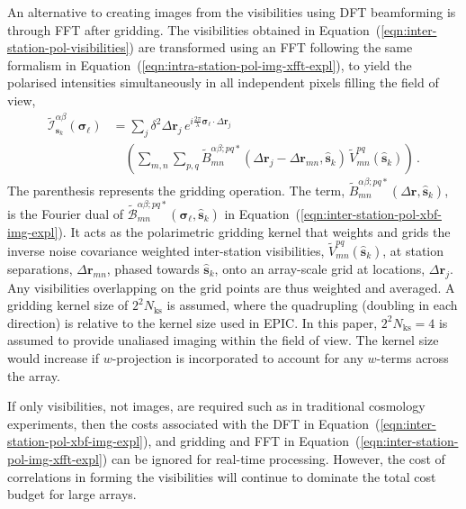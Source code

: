 \documentclass[
  journal=pasa,
  manuscript=article-type,
  year=2020,
  volume=37,
]{cup-journal}
\begin{document}
An alternative to creating images from the visibilities using DFT beamforming is through FFT after gridding. The visibilities obtained in Equation~(\ref{eqn:inter-station-pol-visibilities}) are transformed using an FFT following the same formalism in Equation~(\ref{eqn:intra-station-pol-img-xfft-expl}), to yield the polarised intensities simultaneously in all independent pixels filling the field of view,
\begin{align}
  \widetilde{\mathcal{I}}_{\hat{\boldsymbol{s}}_k}^{\alpha\beta}(\boldsymbol{\sigma}_\ell) &= \sum_j \delta^2 \Delta\boldsymbol{r}_j \, e^{i\frac{2\pi}{\lambda} \boldsymbol{\sigma}_\ell\cdot\Delta\boldsymbol{r}_j} \nonumber\\
  &\quad \left(\sum_{m,n} \sum_{p,q} \widetilde{B}_{mn}^{\alpha\beta;pq*}(\Delta\boldsymbol{r}_j-\Delta\boldsymbol{r}_{mn}, \hat{\boldsymbol{s}}_k) \, \widetilde{V}_{mn}^{pq}(\hat{\boldsymbol{s}}_k) \right) \, . \label{eqn:inter-station-pol-img-xfft-expl}
\end{align}
The parenthesis represents the gridding operation. The term, $\widetilde{B}_{mn}^{\alpha\beta;pq*}(\Delta\boldsymbol{r}, \hat{\boldsymbol{s}}_k)$, is the Fourier dual of $\widetilde{\mathcal{B}}_{mn}^{\alpha\beta;pq*}(\boldsymbol{\sigma}_\ell,\hat{\boldsymbol{s}}_k)$ in Equation~(\ref{eqn:inter-station-pol-xbf-img-expl}). It acts as the polarimetric gridding kernel that weights and grids the inverse noise covariance weighted inter-station visibilities, $\widetilde{V}_{mn}^{pq}(\hat{\boldsymbol{s}}_k)$, at station separations, $\Delta\boldsymbol{r}_{mn}$, phased towards $\hat{\boldsymbol{s}}_k$, onto an array-scale grid at locations, $\Delta\boldsymbol{r}_j$. Any visibilities overlapping on the grid points are thus weighted and averaged. A gridding kernel size of $2^2 N_\textrm{ks}$ is assumed, where the quadrupling (doubling in each direction) is relative to the kernel size used in EPIC. In this paper, $2^2 N_\textrm{ks}=4$ is assumed to provide unaliased imaging within the field of view. The kernel size would increase if $w$-projection is incorporated to account for any $w$-terms across the array.

If only visibilities, not images, are required such as in traditional cosmology experiments, then the costs associated with the DFT in Equation~(\ref{eqn:inter-station-pol-xbf-img-expl}), and gridding and FFT in Equation~(\ref{eqn:inter-station-pol-img-xfft-expl}) can be ignored for real-time processing. However, the cost of correlations in forming the visibilities will continue to dominate the total cost budget for large arrays.
\end{document}
